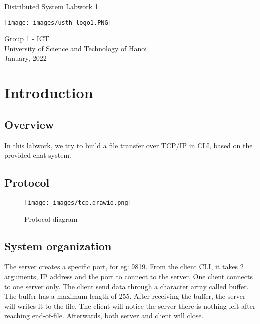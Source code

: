 \documentclass[13pt]{article}
\begin{document}
\begin{titlepage}
    \begin{center}
        \vspace*{1.8cm}
        \Large
        Distributed System Labwork 1\\
        \Large
        \vspace{0.5cm}
        \begin{center}
            \texttt{[image: images/usth\_logo1.PNG]}
        \end{center}  
        \vspace{0.5cm}
            Group 1 - ICT\\
        \vspace{0.5cm}
            University of Science and Technology of Hanoi\\
        \vspace{0.5cm}
            January, 2022
        \vfill
          
   \end{center}
\end{titlepage}

\newpage
\tableofcontents
\newpage

\section{Introduction}
\subsection{Overview}
\noindent%
In this labwork, we try to build a file transfer over TCP/IP in CLI, based on the
provided chat system.

\subsection{Protocol}

\begin{figure}[h]
    \centering
    \texttt{[image: images/tcp.drawio.png]}
    \caption{Protocol diagram}
    \label{fig:protocol}
\end{figure}

\subsection{System organization}
\noindent%
The server creates a specific port, for eg: 9819. From the client CLI, it takes 2 arguments, IP address and the port to connect to the server. One client connects to one server only. The client send data through a character array called buffer. The buffer has a maximum length of 255. After receiving the buffer, the server will writes it to the file. The client will notice the server there is nothing left after reaching end-of-file. Afterwards, both server and client will close.
\end{document}
